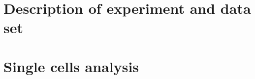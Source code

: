 \chapter{Description of experiment and data set}
\label{chap:Dataset}

\chapter{Single cells analysis}
\label{chap:UnitsAnalysis}

